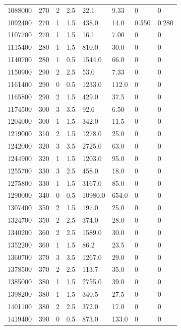 \documentclass[preview]{standalone}
\begin{document}
{{{\begin{tabular}{L{1.2cm}C{1.2cm} C{0.3cm}C{0.5cm} C{1.4cm}C{1.4cm} C{1.4cm}C{1.4cm}}
  1088000  &   270  & 2     & 2.5 &  22.1  & 9.33  & 0 &  0   \\ 
  1092400  &   270  & 1     & 1.5 &  438.0  & 14.0  & 0.550 &  0.280   \\ 
  1107700  &   270  & 1     & 1.5 &  16.1  & 7.00  & 0 &  0   \\ 
  1115400  &   280  & 1     & 1.5 &  810.0  & 30.0  & 0 &  0   \\ 
  1140700  &   280  & 1     & 0.5 &  1544.0  & 66.0  & 0 &  0   \\ 
  1150900  &   290  & 2     & 2.5 &  53.0  & 7.33  & 0 &  0   \\ 
  1161400  &   290  & 0     & 0.5 &  1233.0  & 112.0  & 0 &  0   \\ 
  1165800  &   290  & 2     & 1.5 &  429.0  & 37.5  & 0 &  0   \\ 
  1174500  &   300  & 3     & 3.5 &  92.6  & 6.50  & 0 &  0   \\ 
  1204000  &   300  & 1     & 1.5 &  342.0  & 11.5  & 0 &  0   \\ 
  1219000  &   310  & 2     & 1.5 &  1278.0  & 25.0  & 0 &  0   \\ 
  1242000  &   320  & 3     & 3.5 &  2725.0  & 63.0  & 0 &  0   \\ 
  1244900  &   320  & 1     & 1.5 &  1203.0  & 95.0  & 0 &  0   \\ 
  1255700  &   330  & 3     & 2.5 &  458.0  & 18.0  & 0 &  0   \\ 
  1275800  &   330  & 1     & 1.5 &  3167.0  & 85.0  & 0 &  0   \\ 
  1290000  &   340  & 0     & 0.5 &  10980.0  & 654.0  & 0 &  0   \\ 
  1307400  &   350  & 2     & 1.5 &  197.0  & 25.0  & 0 &  0   \\ 
  1324700  &   350  & 2     & 2.5 &  374.0  & 28.0  & 0 &  0   \\ 
  1340200  &   360  & 2     & 2.5 &  1589.0  & 30.0  & 0 &  0   \\ 
  1352200  &   360  & 1     & 1.5 &  86.2  & 23.5  & 0 &  0   \\ 
  1360700  &   370  & 3     & 3.5 &  1267.0  & 29.0  & 0 &  0   \\ 
  1378500  &   370  & 2     & 2.5 &  113.7  & 35.0  & 0 &  0   \\ 
  1385000  &   380  & 1     & 1.5 &  2755.0  & 39.0  & 0 &  0   \\ 
  1398200  &   380  & 1     & 1.5 &  340.5  & 27.5  & 0 &  0   \\ 
  1401100  &   380  & 2     & 2.5 &  372.0  & 17.0  & 0 &  0   \\ 
  1419400  &   390  & 0     & 0.5 &  873.0  & 133.0  & 0 &  0   \\ 
\hline 
\end{tabular} 

}}}
\end{document}
